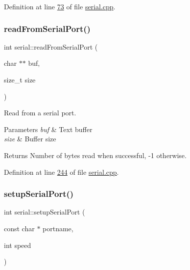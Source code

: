 Definition at line \mbox{\hyperlink{serial_8cpp_source_l00073}{73}} of file \mbox{\hyperlink{serial_8cpp_source}{serial.\+cpp}}.

\mbox{\label{classserial_a0b1ac3334e65f7cb45379aa764c983bf}} 
\subsubsection{\texorpdfstring{read\+From\+Serial\+Port()}{readFromSerialPort()}}
{\footnotesize\ttfamily int serial\+::read\+From\+Serial\+Port (\begin{DoxyParamCaption}\item[{char $\ast$$\ast$}]{buf,  }\item[{size\+\_\+t}]{size }\end{DoxyParamCaption})}



Read from a serial port. 


\begin{DoxyParams}{Parameters}
{\em buf} & Text buffer \\
\hline
{\em size} & Buffer size\\
\hline
\end{DoxyParams}
\begin{DoxyReturn}{Returns}
Number of bytes read when successful, -\/1 otherwise. 
\end{DoxyReturn}


Definition at line \mbox{\hyperlink{serial_8cpp_source_l00244}{244}} of file \mbox{\hyperlink{serial_8cpp_source}{serial.\+cpp}}.

\mbox{\label{classserial_a0490dba2c7616a997ca6db6903f6865a}} 
\subsubsection{\texorpdfstring{setup\+Serial\+Port()}{setupSerialPort()}}
{\footnotesize\ttfamily int serial\+::setup\+Serial\+Port (\begin{DoxyParamCaption}\item[{const char $\ast$}]{portname,  }\item[{int}]{speed }\end{DoxyParamCaption})}




